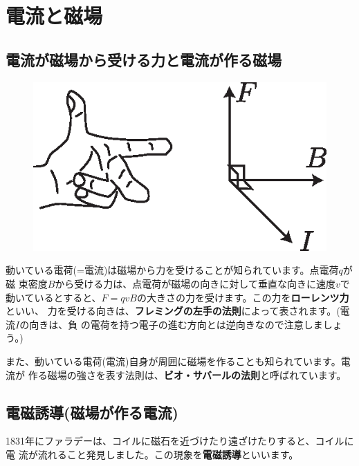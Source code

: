 %
%


\section{電流と磁場}

\subsection{電流が磁場から受ける力と電流が作る磁場}

\begin{figure}
\vspace*{-0.4cm}
\includegraphics[scale=0.9]{07_EleMag/FBI.eps}
\end{figure}


動いている電荷(=電流)は磁場から力を受けることが知られています。点電荷$q$が磁
束密度$B$から受ける力は、点電荷が磁場の向きに対して垂直な向きに速度$v$で
動いているとすると、$F=qvB$の大きさの力を受けます。この力を{\bf ローレンツ力}といい、
力を受ける向きは、{\bf フレミングの左手の法則}によって表されます。(電流$I$の向きは、負
の電荷を持つ電子の進む方向とは逆向きなので注意しましょう。)

また、動いている電荷(電流)自身が周囲に磁場を作ることも知られています。電流が
作る磁場の強さを表す法則は、{\bf ビオ・サバールの法則}と呼ばれています。

\subsection{電磁誘導(磁場が作る電流)}

1831年にファラデーは、コイルに磁石を近づけたり遠ざけたりすると、コイルに電
流が流れること発見しました。この現象を{\bf 電磁誘導}といいます。

